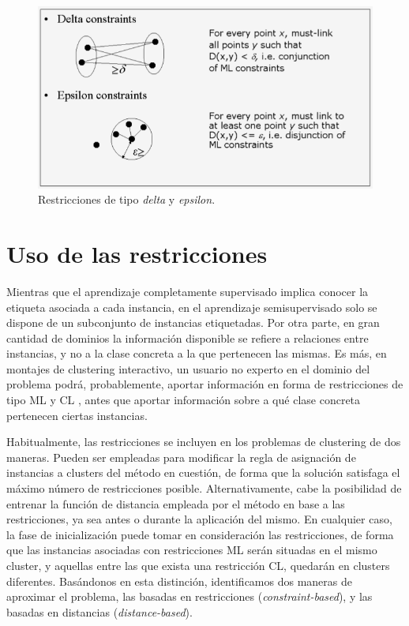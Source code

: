 \begin{figure}[!h]
	\centering
	\includegraphics[scale=0.45]{imagenes/c3/RestriccionesDeltaEpsilo.png} 
	\caption[Restricciones de tipo delta y epsilon.]{Restricciones de tipo \textit{delta} y \textit{epsilon}. \cite{Survey:2007}}\label{fig:figure4}
\end{figure}


\section{Uso de las restricciones}

Mientras que el aprendizaje completamente supervisado implica conocer la etiqueta asociada a cada instancia, en el aprendizaje semisupervisado solo se dispone de un subconjunto de instancias etiquetadas. Por otra parte, en gran cantidad de dominios la información disponible se refiere a relaciones entre instancias, y no a la clase concreta a la que pertenecen las mismas. Es más, en montajes de clustering interactivo, un usuario no experto en el dominio del problema podrá, probablemente, aportar información en forma de restricciones de tipo \acf{ML} y \acf{CL} \cite{Cohn:2003}\cite{DavidsonRavi:2007}, antes que aportar información sobre a qué clase concreta pertenecen ciertas instancias.

Habitualmente, las restricciones se incluyen en los problemas de clustering de dos maneras. Pueden ser empleadas para modificar la regla de asignación de instancias a clusters del método en cuestión, de forma que la solución satisfaga el máximo número de restricciones posible. Alternativamente, cabe la posibilidad de entrenar la función de distancia empleada por el método en base a las restricciones, ya sea antes o durante la aplicación del mismo. En cualquier caso, la fase de inicialización puede tomar en consideración las restricciones, de forma que las instancias asociadas con restricciones \acf{ML} serán situadas en el mismo cluster, y aquellas entre las que exista una restricción \acf{CL}, quedarán en clusters diferentes. Basándonos en esta distinción, identificamos dos maneras de aproximar el problema, las basadas en restricciones (\textit{constraint-based}), y las basadas en distancias (\textit{distance-based}).


